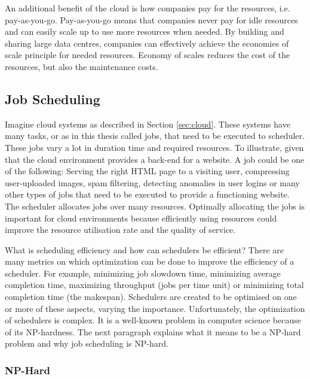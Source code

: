 An additional benefit of the cloud is how companies pay for the resources,
i.e. pay-as-you-go. Pay-as-you-go means that companies never pay for idle
resources and can easily scale up to use more resources when needed. By
building and sharing large data centres, companies can effectively achieve the
economies of scale principle for needed resources. Economy of scales reduces
the cost of the resources, but also the maintenance costs.


\subsection{Job Scheduling}\label{sec:scheduling}

Imagine cloud systems as described in Section \ref{sec:cloud}. These systems
have many tasks, or as in this thesis called jobs, that need to be executed to
scheduler. These jobs vary a lot in duration time and required resources. To
illustrate, given that the cloud environment provides a back-end for a
website. A job could be one of the following: Serving the right HTML page to a
visiting user, compressing user-uploaded images, spam filtering, detecting
anomalies in user logins or many other types of jobs that need to be executed
to provide a functioning website. The scheduler allocates jobs over
many resources. Optimally allocating the jobs is important for cloud
environments because efficiently using resources could improve the resource
utilisation rate and the quality of service.

What is scheduling efficiency and how can schedulers be efficient? There are
many metrics on which optimization can be done to improve the efficiency of a
scheduler. For example, minimizing job slowdown time, minimizing average
completion time, maximizing throughput (jobs per time unit) or minimizing
total completion time (the makespan). Schedulers are created to be optimised
on one or more of these aspects, varying the importance. Unfortunately, the
optimization of schedulers is complex. It is a well-known problem in computer
science because of its NP-hardness. The next paragraph explains what it means
to be a NP-hard problem and why job scheduling is NP-hard.


\subsubsection{NP-Hard}

